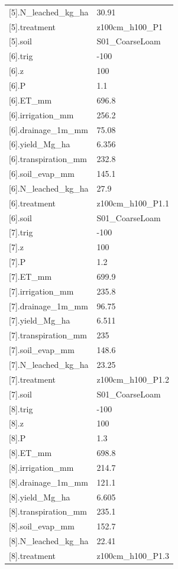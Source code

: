 {\begin{longtable}{p{}p{}}
{}[5].N\_leached\_kg\_ha & 30.91\\
{}[5].treatment & z100cm\_h100\_P1\\
{}[5].soil & S01\_CoarseLoam\\
{}[6].trig & -100\\
{}[6].z & 100\\
{}[6].P & 1.1\\
{}[6].ET\_mm & 696.8\\
{}[6].irrigation\_mm & 256.2\\
{}[6].drainage\_1m\_mm & 75.08\\
{}[6].yield\_Mg\_ha & 6.356\\
{}[6].transpiration\_mm & 232.8\\
{}[6].soil\_evap\_mm & 145.1\\
{}[6].N\_leached\_kg\_ha & 27.9\\
{}[6].treatment & z100cm\_h100\_P1.1\\
{}[6].soil & S01\_CoarseLoam\\
{}[7].trig & -100\\
{}[7].z & 100\\
{}[7].P & 1.2\\
{}[7].ET\_mm & 699.9\\
{}[7].irrigation\_mm & 235.8\\
{}[7].drainage\_1m\_mm & 96.75\\
{}[7].yield\_Mg\_ha & 6.511\\
{}[7].transpiration\_mm & 235\\
{}[7].soil\_evap\_mm & 148.6\\
{}[7].N\_leached\_kg\_ha & 23.25\\
{}[7].treatment & z100cm\_h100\_P1.2\\
{}[7].soil & S01\_CoarseLoam\\
{}[8].trig & -100\\
{}[8].z & 100\\
{}[8].P & 1.3\\
{}[8].ET\_mm & 698.8\\
{}[8].irrigation\_mm & 214.7\\
{}[8].drainage\_1m\_mm & 121.1\\
{}[8].yield\_Mg\_ha & 6.605\\
{}[8].transpiration\_mm & 235.1\\
{}[8].soil\_evap\_mm & 152.7\\
{}[8].N\_leached\_kg\_ha & 22.41\\
{}[8].treatment & z100cm\_h100\_P1.3\\

\end{longtable}}
